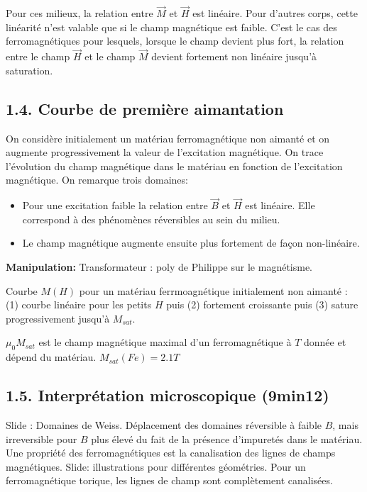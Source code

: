 \documentclass[french, a4paper, 10pt, twocolumn, landscape]{article}
\begin{document}
Pour ces milieux, la relation entre $\vec{M}$ et $\vec{H}$ est linéaire. Pour d'autres corps, cette linéarité n'est valable que si le champ magnétique est faible. C'est le cas des ferromagnétiques pour lesquels, lorsque le champ devient plus fort, la relation entre le champ $\vec{H}$ et le champ $\vec{M}$ devient fortement non linéaire jusqu'à saturation.

\subsection*{1.4. Courbe de première aimantation}

On considère initialement un matériau ferromagnétique non aimanté et on augmente progressivement la valeur de l'excitation magnétique. On trace l'évolution du champ magnétique dans le matériau en fonction de l'excitation magnétique. On remarque trois domaines:

\begin{itemize}
    \item Pour une excitation faible la relation entre $\vec{B}$ et $\vec{H}$ est linéaire. Elle correspond à des phénomènes réversibles au sein du milieu.
    \item Le champ magnétique augmente ensuite plus fortement de façon non-linéaire.
\end{itemize}

\textbf{Manipulation:} Transformateur : poly de Philippe sur le magnétisme.

Courbe $M(H)$ pour un matériau ferrmoagnétique initialement non aimanté : (1) courbe linéaire pour les petits $H$ puis (2) fortement croissante puis (3) sature progressivement jusqu'à $M_{sat}$.

$\mu_0 M_{sat}$ est le champ magnétique maximal d'un ferromagnétique à $T$ donnée et dépend du matériau. $M_{sat}(Fe) = 2.1 T$

\subsection*{1.5. Interprétation microscopique (9min12)}
Slide : Domaines de Weiss. Déplacement des domaines réversible à faible $B$, mais irreversible pour $B$ plus élevé du fait de la présence d'impuretés dans le matériau.\\

Une propriété des ferromagnétiques est la canalisation des lignes de champs magnétiques. Slide: illustrations pour différentes géométries. Pour un ferromagnétique torique, les lignes de champ sont complètement canalisées.
\end{document}
